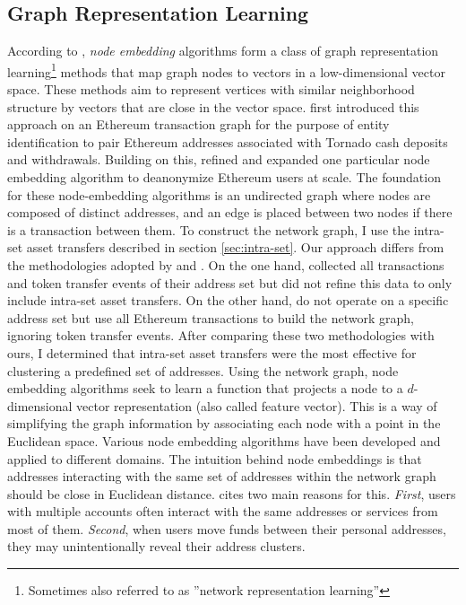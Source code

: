 \documentclass[12pt,a4paper,titlepage,oneside,english]{article}
\begin{document}
\subsection{Graph Representation Learning}
\label{sec:node}
According to \cite{Beres2020}, \textit{node embedding} algorithms form a class of graph representation learning\footnote{Sometimes also referred to as ''network representation learning''} methods that map graph nodes to vectors in a low-dimensional vector space. These methods aim to represent vertices with similar neighborhood structure by vectors that are close in the vector space. \newline
\cite{Beres2020} first introduced this approach on an Ethereum transaction graph for the purpose of entity identification to pair Ethereum addresses associated with Tornado cash deposits and withdrawals. Building on this, \cite{wu2022tutela} refined and expanded one particular node embedding algorithm to deanonymize Ethereum users at scale. \newline
The foundation for these node-embedding algorithms is an undirected graph where nodes are composed of distinct addresses, and an edge is placed between two nodes if there is a transaction between them. \newline
To construct the network graph, I use the intra-set asset transfers described in section \ref{sec:intra-set}. Our approach differs from the methodologies adopted by \cite{Beres2020} and \cite{wu2022tutela}. On the one hand, \cite{Beres2020} collected all transactions and token transfer events of their address set but did not refine this data to only include intra-set asset transfers. On the other hand, \cite{wu2022tutela} do not operate on a specific address set but use all Ethereum transactions to build the network graph, ignoring token transfer events. After comparing these two methodologies with ours, I determined that intra-set asset transfers were the most effective for clustering a predefined set of addresses. %
\newline
Using the network graph, node embedding algorithms seek to learn a function that projects a node to a $d$-dimensional vector representation (also called feature vector). This is a way of simplifying the graph information by associating each node with a point in the Euclidean space. Various node embedding algorithms have been developed and applied to different domains. \citep{rozemberczki2020difftovec} \newline
The intuition behind node embeddings is that addresses interacting with the same set of addresses within the network graph should be close in Euclidean distance. \cite{Beres2020} cites two main reasons for this. \textit{First}, users with multiple accounts often interact with the same addresses or services from most of them. \textit{Second}, when users move funds between their personal addresses, they may unintentionally reveal their address clusters. \newline
\end{document}
